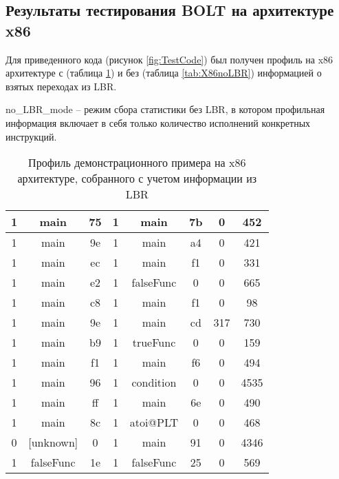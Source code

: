 \subsection{Результаты тестирования BOLT на архитектуре x86}\label{subsec:ch1/sec3/sub3}
Для приведенного кода (рисунок \cref{fig:TestCode}) был получен профиль на x86 архитектуре с (таблица \cref{tab:X86LBR}) и без (таблица \cref{tab:X86noLBR}) информацией о взятых переходах из LBR.

no\_LBR\_mode – режим сбора статистики без LBR, в котором профильная информация включает в себя только количество исполнений конкретных инструкций.
\begin{table} [!h]%
    \centering
    \begin{threeparttable}%
        \caption{Профиль демонстрационного примера на x86 архитектуре, собранного с учетом информации из LBR}%
        \label{tab:X86LBR}%
        \begin{SingleSpace}
            \begin{tabular}{| c | c | c | c | c | c | c | c |}
                \hline
                	1 & main &      75 & 1 & main &      7b & 0 &   452 \\ \hline
				1 & main &      9e & 1 & main &      a4 & 0 &   421 \\ \hline
				1 & main &      ec & 1 & main &      f1 & 0 &   331 \\ \hline
				1 & main &      e2 & 1 & falseFunc & 0 &  0 &   665 \\ \hline
				1 & main &      c8 & 1 & main &      f1 & 0 &   98 \\ \hline
				1 & main &      9e & 1 & main &      cd & 317 &  730 \\ \hline
				1 & main &      b9 & 1 & trueFunc &  0 &  0 &   159 \\ \hline
				1 & main &      f1 & 1 & main &      f6 & 0 &   494 \\ \hline
				1 & main &      96 & 1 & condition & 0 &  0 &   4535 \\ \hline
				1 & main &      ff & 1 & main &      6e & 0 &   490 \\ \hline
				1 & main &      8c & 1 & atoi@PLT &  0 &  0 &   468 \\ \hline
				0 & [unknown] & 0 &  1 & main &      91 & 0 &   4346 \\ \hline
				1 & falseFunc & 1e & 1 & falseFunc & 25 & 0 &   569 \\ \hline

\end{tabular}
\end{SingleSpace}
\end{threeparttable}
\end{table}

